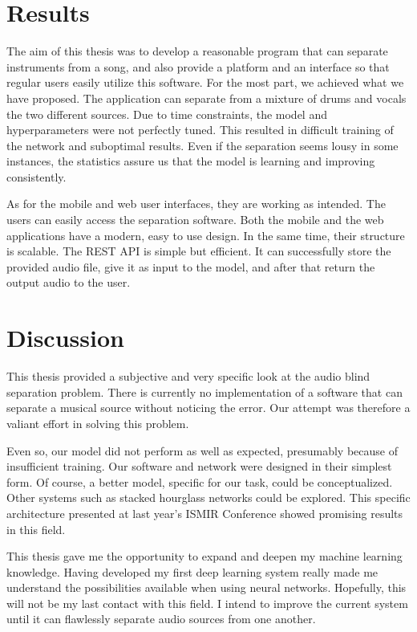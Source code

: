 \documentclass[../Thesis.tex]{subfiles}
\begin{document}
\section {Results}

The aim of this thesis was to develop a reasonable program that can separate instruments from a song, and also provide a platform and an interface so that regular users easily utilize this software. For the most part, we achieved what we have proposed. The application can separate from a mixture of drums and vocals the two different sources. Due to time constraints, the model and hyperparameters were not perfectly tuned. This resulted in difficult training of the network and suboptimal results. Even if the separation seems lousy in some instances, the statistics assure us that the model is learning and improving consistently. 

As for the mobile and web user interfaces, they are working as intended. The users can easily access the separation software. Both the mobile and the web applications have a modern, easy to use design. In the same time, their structure is scalable.
The REST API is simple but efficient. It can successfully store the provided audio file, give it as input to the model, and after that return the output audio to the user. 


\section {Discussion}

This thesis provided a subjective and very specific look at the audio blind separation problem. There is currently no implementation of a software that can separate a musical source without noticing the error. Our attempt was therefore a valiant effort in solving this problem.

Even so, our model did not perform as well as expected, presumably because of insufficient training. Our software and network were designed in their simplest form. Of course, a better model, specific for our task, could be conceptualized. Other systems such as stacked hourglass networks could be explored. This specific architecture presented at last year’s ISMIR Conference showed promising results in this field.

This thesis gave me the opportunity to expand and deepen my machine learning knowledge. Having developed my first deep learning system really made me understand the possibilities available when using neural networks. Hopefully, this will not be my last contact with this field. I intend to improve the current system until it can flawlessly separate audio sources from one another.
\end{document}
